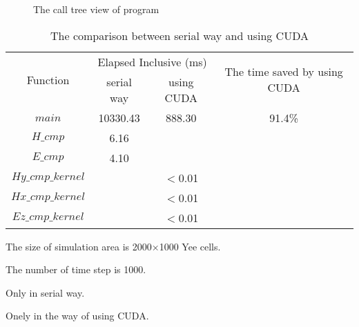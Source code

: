 \begin{figure}[hp]
	\vspace{3.118mm}%
	\caption{The call tree view of program}
	\label{ch4:call tree}
	\vspace{2.736mm}%
\end{figure}

\begin{table}[hp]
	\centering
	\begin{threeparttable}
		\caption{The comparison between serial way and using CUDA}\label{ch4: cuda or not}
		\begin{tabular}{cccc}
			\toprule
			\multirow{2}{2em}{Function}&\multicolumn{2}{c}{Elapsed Inclusive (ms)} & \multirow{2}{14em}{The time saved by using CUDA}\\
			\cline{2-3}
			& serial way & using CUDA & \\ 
			
			\midrule
			$main$ & 10330.43 & 888.30 & 91.4\% \\
			$H\_cmp$\tnote{3} & 6.16 &  & \\ 
			$E\_cmp$\tnote{3} & 4.10 &  & \\
			$Hy\_cmp\_kernel$\tnote{4} &  & $<$0.01 & \\ 
			$Hx\_cmp\_kernel$\tnote{4} &  & $<$0.01 & \\ 
			$Ez\_cmp\_kernel$\tnote{4} &  & $<$0.01 & \\
			\bottomrule
		\end{tabular} 
		\begin{tablenotes}
			\item[1] The size of simulation area is 2000$\times$1000 Yee cells.
			\item[2] The number of time step is 1000.
			\item[3] Only in serial way.
			\item[4] Onely in the way of using CUDA.
		\end{tablenotes}
	\end{threeparttable}
\end{table}

